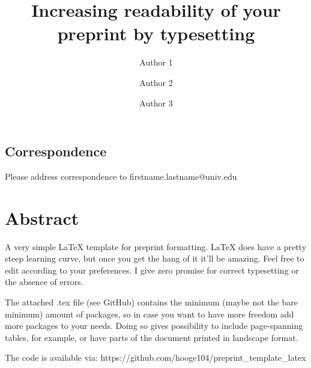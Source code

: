 \documentclass[onecolumn, 11pt,openany]{memoir}
\begin{document}
\thispagestyle{empty}                   
\frontmatter

\title{Increasing readability of your preprint by typesetting}
\author[1,2]{Author 1}
\author[1]{Author 2}
\author[3]{Author 3}
\begin{scriptsize}
\end{scriptsize}
\date{\vspace{-5ex}} %
\maketitle

\subsection{Correspondence}
Please address correspondence to firstname.lastname@univ.edu

\pagestyle{plain}

\section{Abstract}
A very simple \LaTeX{} template for preprint formatting. LaTeX does have a pretty steep learning curve, but once you get the hang of it it'll be amazing.  Feel free to edit according to your preferences. I give zero promise for correct typesetting or the absence of errors. 

The attached .tex file (see GitHub) contains the minimum (maybe not the bare minimum) amount of packages, so in case you want to have more freedom add more packages to your needs. Doing so gives possibility to include page-spanning tables, for example, or have parts of the document printed in landscape format.

The code is available via: https://github.com/hooge104/preprint\_template\_latex
\end{document}

